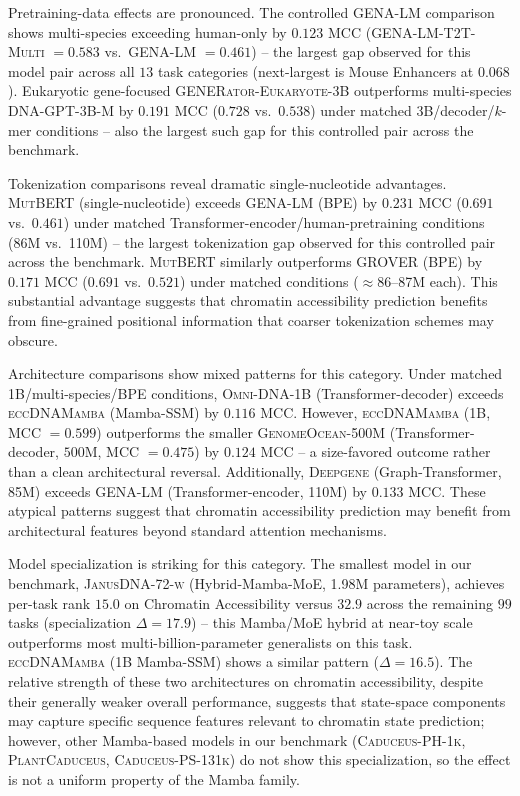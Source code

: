\documentclass{llmxive}
\begin{document}
Pretraining-data effects are pronounced. The controlled
\textsc{GENA-LM} comparison shows multi-species exceeding
human-only by $0.123$ MCC (\textsc{GENA-LM-T2T-Multi} $= 0.583$
vs.\ \textsc{GENA-LM} $= 0.461$) -- the largest gap observed
for this model pair across all $13$ task categories (next-largest
is Mouse Enhancers at $0.068$). Eukaryotic gene-focused
\textsc{GENERator-Eukaryote-3B} outperforms multi-species
\textsc{DNA-GPT-3B-M} by $0.191$ MCC ($0.728$ vs.\ $0.538$)
under matched 3B/decoder/$k$-mer conditions -- also the largest
such gap for this controlled pair across the benchmark.

Tokenization comparisons reveal dramatic single-nucleotide
advantages. \textsc{MutBERT} (single-nucleotide) exceeds
\textsc{GENA-LM} (BPE) by $0.231$ MCC ($0.691$ vs.\ $0.461$)
under matched Transformer-encoder/human-pretraining conditions
(86M vs.\ 110M) -- the largest tokenization gap observed for
this controlled pair across the benchmark. \textsc{MutBERT}
similarly outperforms \textsc{GROVER} (BPE) by $0.171$ MCC
($0.691$ vs.\ $0.521$) under matched conditions
($\approx$86--87M each). This substantial advantage suggests
that chromatin accessibility prediction benefits from
fine-grained positional information that coarser tokenization
schemes may obscure.

Architecture comparisons show mixed patterns for this category.
Under matched 1B/multi-species/BPE conditions,
\textsc{Omni-DNA-1B} (Transformer-decoder) exceeds
\textsc{eccDNAMamba} (Mamba-SSM) by $0.116$ MCC. However,
\textsc{eccDNAMamba} (1B, MCC $= 0.599$) outperforms the smaller
\textsc{GenomeOcean-500M} (Transformer-decoder, $500$M, MCC $=
0.475$) by $0.124$ MCC -- a size-favored outcome rather than a
clean architectural reversal. Additionally,
\textsc{Deepgene} (Graph-Transformer, 85M) exceeds
\textsc{GENA-LM} (Transformer-encoder, 110M) by $0.133$ MCC.
These atypical patterns suggest that chromatin accessibility
prediction may benefit from architectural features beyond
standard attention mechanisms.

Model specialization is striking for this category. The smallest
model in our benchmark, \textsc{JanusDNA-72-w} (Hybrid-Mamba-MoE,
1.98M parameters), achieves per-task rank $15.0$ on Chromatin
Accessibility versus $32.9$ across the remaining $99$ tasks
(specialization $\Delta = 17.9$) -- this Mamba/MoE hybrid at
near-toy scale outperforms most multi-billion-parameter
generalists on this task. \textsc{eccDNAMamba} (1B Mamba-SSM)
shows a similar pattern ($\Delta = 16.5$). The relative strength
of these two architectures on chromatin accessibility, despite
their generally weaker overall performance, suggests that
state-space components may capture specific sequence features
relevant to chromatin state prediction; however, other
Mamba-based models in our benchmark (\textsc{Caduceus-PH-1k},
\textsc{PlantCaduceus}, \textsc{Caduceus-PS-131k}) do not show
this specialization, so the effect is not a uniform property of
the Mamba family.
\end{document}
